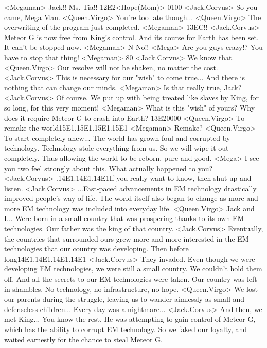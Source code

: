 <Megaman> Jack!! Ms. Tia!! 
{12}{E2}<Hope(Mom)> {01}{00} 
<Jack.Corvus> So you came, Mega Man. 
<Queen.Virgo> You're too late though... 
<Queen.Virgo> The overwriting of the program just completed. 
<Megaman> {13}{EC}!! 
<Jack.Corvus> Meteor G is now free from King's control. 
And its course for Earth has been set. 
It can't be stopped now. 
<Megaman> N-No!! 
<Mega> Are you guys crazy!? You have to stop that thing! 
<Megaman> 80%
<Jack.Corvus> We know that. 
<Queen.Virgo> Our resolve will not be shaken, no matter the cost. 
<Jack.Corvus> This is necessary for our "wish" to come true... 
And there is nothing that can change our minds. 
<Megaman> Is that really true, Jack? 
<Jack.Corvus> Of course. 
We put up with being treated like slaves by King, for so long, for this very moment! 
<Megaman> What is this "wish" of yours? 
Why does it require Meteor G to crash into Earth? 
{13}{E2}{00}{00} 
<Queen.Virgo> To remake the world{15}{E1}.{15}{E1}.{15}{E1}.{15}{E1} 
<Megaman> Remake? 
<Queen.Virgo> To start completely anew... 
The world has grown foul and corrupted by technology. 
Technology stole everything from us. So we will wipe it out completely. 
Thus allowing the world to be reborn, pure and good. 
<Mega> I see you two feel strongly about this. 
What actually happened to you? 
<Jack.Corvus> .{14}{E1}.{14}{E1}.{14}{E1}If you really want to know, then shut up and listen. 
<Jack.Corvus> ...Fast-paced advancements in EM technology drastically improved people's way of life. 
The world itself also began to change as more and more 
EM technology was included into everyday life. 
<Queen.Virgo> Jack and I... 
Were born in a small country that was prospering thanks to its own EM technologies. 
Our father was the king of that country. 
<Jack.Corvus> Eventually, the countries that surrounded ours grew 
more and more interested in the EM technologies that our country was developing. 
Then before long{14}{E1}.{14}{E1}.{14}{E1}.{14}{E1} 
<Jack.Corvus> They invaded. 
Even though we were developing EM technologies, we were still a small country. 
We couldn't hold them off. And all the secrets to our EM technologies were taken. 
Our country was left in shambles. No technology, no infrastructure, no hope. 
<Queen.Virgo> We lost our parents during the struggle, leaving us to 
wander aimlessly as small and defenseless children... 
Every day was a nightmare... 
<Jack.Corvus> And then, we met King... 
You know the rest. 
He was attempting to gain control of Meteor G, which 
has the ability to corrupt EM technology. 
So we faked our loyalty, and waited earnestly for the chance to steal Meteor G. 
